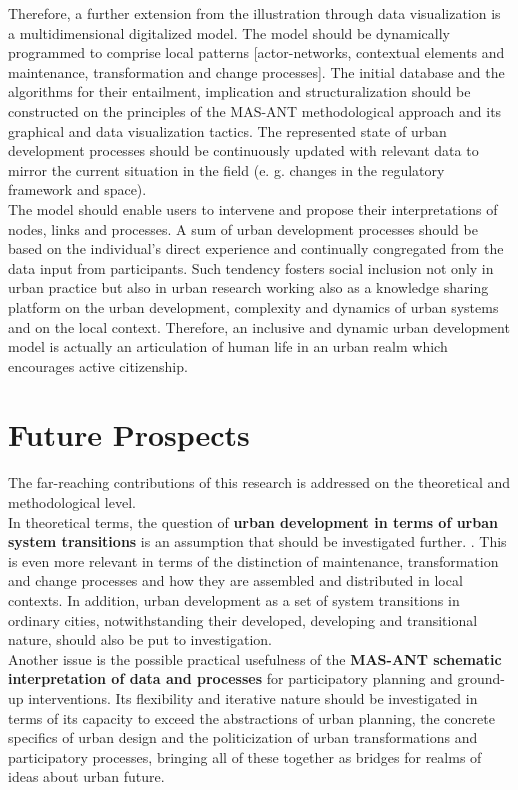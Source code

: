 \documentclass[11pt]{report}
\begin{document}
{{{Therefore, a further extension from the illustration through data visualization is a multidimensional digitalized model.
The model should be dynamically programmed to comprise local patterns [actor-networks, contextual elements and maintenance, transformation and change processes].
The initial database and the algorithms for their entailment, implication and structuralization should be constructed on the principles of the MAS-ANT methodological approach and its graphical and data visualization tactics.
The represented state of urban development processes should be continuously updated with relevant data to mirror  the current situation in the field (e. g. changes in the regulatory framework and space).
\\

The model should enable users to intervene and propose their interpretations of nodes, links and processes.
A sum of urban development processes should be based on the individual's direct experience and continually congregated from the data input from participants.
Such tendency fosters social inclusion not only in urban practice but also in urban research working also as a knowledge sharing platform on the urban development, complexity and dynamics of urban systems and on the local context.
Therefore, an inclusive and dynamic urban development model is actually an articulation of human life in an urban realm which encourages active citizenship.

\section{Future Prospects}

The far-reaching contributions of this research is addressed on the theoretical and methodological level. 
\\

In theoretical terms, the question of \textbf{urban development in terms of urban system transitions} is an assumption that should be investigated further. . This is even more relevant in terms of the distinction of maintenance, transformation and change processes and how they are assembled and distributed in local contexts. In addition, urban development as a set of system transitions in ordinary cities, notwithstanding their developed, developing and transitional nature, should also be put to investigation.
\\

Another issue is the possible practical usefulness of the \textbf{MAS-ANT schematic interpretation of data and processes} for participatory planning and ground-up interventions.
Its flexibility and iterative nature should be investigated in terms of its capacity to exceed the abstractions of urban planning, the concrete specifics of urban design and the politicization of urban transformations and participatory processes, bringing all of these together as bridges for realms of ideas about urban future.
\\

}}}
\end{document}
